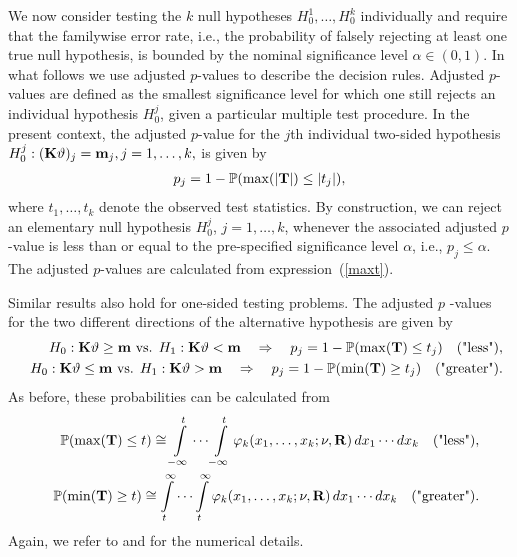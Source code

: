 \documentclass[12pt]{article}
\begin{document}
\label{simtest} %

We now consider testing the $k$ null hypotheses $H_0^1, \ldots, H_0^k$
individually and require that the familywise error rate, i.e., the
probability of falsely rejecting at least one true null hypothesis, is
bounded by the nominal significance level $\alpha \in (0, 1)$. In what
follows we use adjusted $p$-values to describe the decision rules. Adjusted $%
p$-values are defined as the smallest significance level for which one still
rejects an individual hypothesis $H_0^j$, given a particular multiple test
procedure. In the present context, the adjusted $p$-value for the $j$th
individual two-sided hypothesis $H_0^j: (\mathbf{K} \vartheta)_j = \mathbf{m}_j, j = 1,
\dots, k, $ is given by 
\begin{eqnarray*}
p_j = 1 - \mathbb{P}(\max(|\mathbf{T}|) \le |t_j|),
\end{eqnarray*}
where $t_1, \dots, t_k$ denote the observed test statistics. By
construction, we can reject an elementary null hypothesis $H_0^j$, $j= 1,
\ldots, k$, whenever the associated adjusted $p$-value is less than or equal
to the pre-specified significance level $\alpha$, i.e., $p_j \leq \alpha$.
The adjusted $p$-values are calculated from expression~(\ref{maxt}).

Similar results also hold for one-sided testing problems. The adjusted $p$%
-values for the two different directions of the alternative hypothesis are
given by 
\begin{eqnarray*}
& & H_0: \mathbf{K} \vartheta \ge \mathbf{m} \text{ vs. } H_1: \mathbf{K} \vartheta < \mathbf{m} \quad
\Rightarrow \quad p_j = 1 - \mathbb{P}(\max(\mathbf{T}) \le t_j) \quad \text{("less")}, \\
& & H_0: \mathbf{K} \vartheta \le \mathbf{m} \text{ vs. } H_1: \mathbf{K} \vartheta > \mathbf{m} \quad
\Rightarrow \quad p_j = 1 - \mathbb{P}(\min(\mathbf{T}) \ge t_j) \quad \text{("greater")}.
\end{eqnarray*}
As before, these probabilities can be calculated from 
\begin{eqnarray*}
& & \mathbb{P}(\max(\mathbf{T}) \le t) \cong\int\limits_{-\infty}^t \cdots
\int\limits_{-\infty}^t \varphi_k(x_1, \dots, x_k; \nu, \mathbf{R}) \, dx_1 \cdots
dx_k \quad \text{("less")}, \\
& & \mathbb{P}(\min(\mathbf{T}) \ge t) \cong \int\limits_{t}^\infty \cdots
\int\limits_{t}^\infty \varphi_k(x_1, \dots, x_k; \nu, \mathbf{R}) \, dx_1 \cdots
dx_k \quad \text{("greater")}.
\end{eqnarray*}
Again, we refer to \cite{Genz1992,GenzBretz1999,BretzGenzHothorn2001} and 
\cite{GenzBretz2002} for the numerical details.
\end{document}
